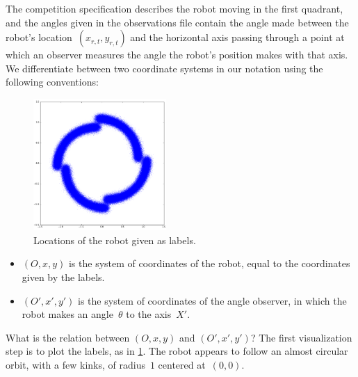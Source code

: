 \documentclass[twoside]{article}
\begin{document}
The competition specification describes the robot moving in the first quadrant, and the angles given in the observations file contain the angle made between the robot's location~${(x_{r, t}, y_{r, t})}$ and the horizontal axis passing through a point at which an observer measures the angle the robot's position makes with that axis.
We differentiate between two coordinate systems in our notation using the following conventions:
\begin{figure}
  \centering
  \includegraphics[width=0.45\textwidth]{images/AK1}
  \caption{Locations of the robot given as labels.}\label{fig:label-locations}
\end{figure}
\begin{itemize}[topsep=2pt]
\item ${(O, x, y)}$ is the system of coordinates of the robot, equal to the coordinates given by the labels.
\item ${(O', x', y')}$ is the system of coordinates of the angle observer, in which the robot makes an angle~$\theta$ to the axis~$X'$.
\end{itemize}
What is the relation between ${(O, x, y)}$ and ${(O', x', y')}$?
The first visualization step is to plot the labels, as in \cref{fig:label-locations}.
The robot appears to follow an almost circular orbit, with a few kinks, of radius~$1$ centered at~$(0, 0)$.
\end{document}
